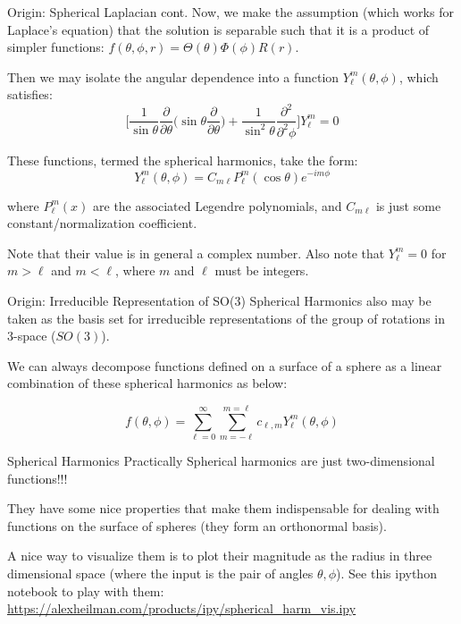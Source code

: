 \documentclass[handout, 11pt]{beamer}
\begin{document}
\begin{frame}{Origin: Spherical Laplacian cont.}\small
Now, we make the assumption (which works for Laplace's equation) that the solution is separable such that it is a product of simpler functions:  $f(\theta,\phi, r)=\Theta(\theta)\Phi(\phi)R(r)$.

\medskip

Then we may isolate the angular dependence into a function $Y_{\ell}^{m}(\theta,\phi)$, which satisfies:
$$\Bigg[\frac{1}{\sin\theta}\frac{\partial}{\partial \theta}\Big(\sin\theta\frac{\partial}{\partial \theta}\Big)+\frac{1}{\sin^2\theta}\frac{\partial^2}{\partial^2 \phi}\Bigg]Y^m_{\ell}=0$$
\pause


These functions, termed the spherical harmonics, take the form:
$$
Y_{\ell}^{m}(\theta,\phi)=C_{m\ell}P_{\ell}^m (\cos\theta)e^{-im\phi} 
$$

where $P^{m}_{\ell}(x)$ are the associated Legendre polynomials, and $C_{m\ell}$ is just some constant/normalization coefficient.

\medskip\pause

Note that their value is in general a complex number. Also note that $Y_{\ell}^m =0$ for $m>\ell$ and $m<\ell$, where $m$ and $\ell$ must be integers.\normalsize
\end{frame}

\begin{frame}{Origin: Irreducible Representation of SO(3)}
Spherical Harmonics also may be taken as the basis set for irreducible representations of the group of rotations in 3-space ($SO(3)$).

\vspace{.4cm}\pause

We can always decompose functions defined on a surface of a sphere as a linear combination of these spherical harmonics as below:

$$
f(\theta, \phi) = \sum_{\ell=0}^{\infty}\sum_{m=-\ell}^{m=\ell}c_{\ell, m}Y_{\ell}^m(\theta, \phi) 
$$

\end{frame}

\begin{frame}{Spherical Harmonics Practically}
Spherical harmonics are just two-dimensional functions!!!

\vspace{0.4cm}\pause

They have some nice properties  that make them indispensable for dealing with functions on the surface of spheres (they form an orthonormal basis). 

\vspace{0.4cm}\pause

A nice way to visualize them is to plot their magnitude as the radius in three dimensional space (where the input is the pair of angles $\theta, \phi$). See this ipython notebook to play with them: \url{https://alexheilman.com/products/ipy/spherical_harm_vis.ipy}
\end{frame}
\end{document}
